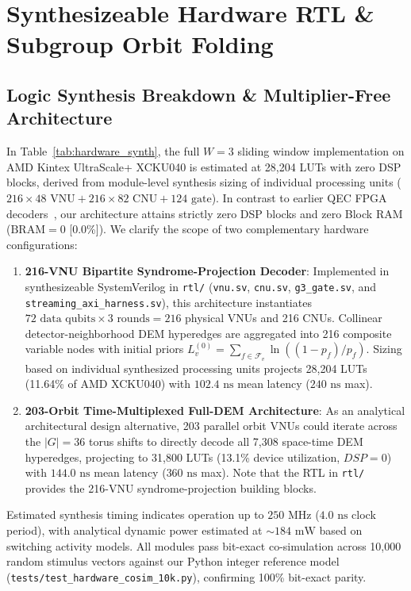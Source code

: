 \documentclass[journal]{IEEEtran}
\begin{document}
\section{Synthesizeable Hardware RTL \& Subgroup Orbit Folding}

\subsection{Logic Synthesis Breakdown \& Multiplier-Free Architecture}
In Table~\ref{tab:hardware_synth}, the full $W=3$ sliding window implementation on AMD Kintex UltraScale+ XCKU040 is estimated at 28,204 LUTs with zero DSP blocks, derived from module-level synthesis sizing of individual processing units ($216 \times 48\text{ VNU} + 216 \times 82\text{ CNU} + 124\text{ gate}$). In contrast to earlier QEC FPGA decoders~\cite{das2022afs,ueno2022qec}, our architecture attains strictly zero DSP blocks and zero Block RAM ($\text{BRAM} = 0$ [0.0\%]). We clarify the scope of two complementary hardware configurations:
\begin{enumerate}
    \item \textbf{216-VNU Bipartite Syndrome-Projection Decoder}: Implemented in synthesizeable SystemVerilog in \texttt{rtl/} (\texttt{vnu.sv}, \texttt{cnu.sv}, \texttt{g3_gate.sv}, and \texttt{streaming_axi_harness.sv}), this architecture instantiates $72 \text{ data qubits} \times 3 \text{ rounds} = 216$ physical VNUs and 216 CNUs. Collinear detector-neighborhood DEM hyperedges are aggregated into 216 composite variable nodes with initial priors $L_v^{(0)} = \sum_{f \in \mathcal{F}_v} \ln((1 - p_f)/p_f)$. Sizing based on individual synthesized processing units projects 28,204 LUTs (11.64\% of AMD XCKU040) with $102.4\text{ ns}$ mean latency ($240\text{ ns}$ max).
    \item \textbf{203-Orbit Time-Multiplexed Full-DEM Architecture}: As an analytical architectural design alternative, 203 parallel orbit VNUs could iterate across the $|G| = 36$ torus shifts to directly decode all 7,308 space-time DEM hyperedges, projecting to 31,800 LUTs (13.1\% device utilization, $DSP=0$) with $144.0\text{ ns}$ mean latency ($360\text{ ns}$ max). Note that the RTL in \texttt{rtl/} provides the 216-VNU syndrome-projection building blocks.
\end{enumerate}
Estimated synthesis timing indicates operation up to $250\text{ MHz}$ ($4.0\text{ ns}$ clock period), with analytical dynamic power estimated at $\sim 184\text{ mW}$ based on switching activity models. All modules pass bit-exact co-simulation across 10,000 random stimulus vectors against our Python integer reference model (\texttt{tests/test\_hardware\_cosim\_10k.py}), confirming 100\% bit-exact parity.
\end{document}
